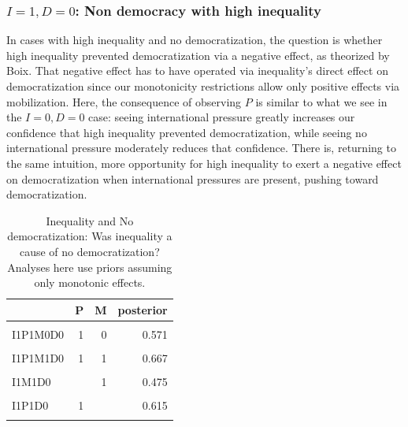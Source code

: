 \documentclass[
  12pt,
]{book}
\begin{document}
\hypertarget{i1-d0-non-democracy-with-high-inequality}{%
\subsubsection{\texorpdfstring{\(I=1, D=0\): Non democracy with high inequality}{I=1, D=0: Non democracy with high inequality}}\label{i1-d0-non-democracy-with-high-inequality}}

In cases with high inequality and no democratization, the question is whether high inequality prevented democratization via a negative effect, as theorized by Boix. That negative effect has to have operated via inequality's direct effect on democratization since our monotonicity restrictions allow only positive effects via mobilization. Here, the consequence of observing \(P\) is similar to what we see in the \(I=0, D=0\) case: seeing international pressure greatly increases our confidence that high inequality prevented democratization, while seeing no international pressure moderately reduces that confidence. There is, returning to the same intuition, more opportunity for high inequality to exert a negative effect on democratization when international pressures are present, pushing toward democratization.

\begin{table}

\caption{\label{tab:Tapp2}Inequality and No democratization: Was inequality a cause of no democratization? Analyses here use priors assuming only monotonic effects.}
\centering
\begin{tabular}[t]{lrrr}
\toprule
  & P & M & posterior\\
\midrule
\cellcolor{gray!6}{I1P0M0D0} & \cellcolor{gray!6}{0} & \cellcolor{gray!6}{0} & \cellcolor{gray!6}{0.263}\\
I1P1M0D0 & 1 & 0 & 0.571\\
\cellcolor{gray!6}{I1P0M1D0} & \cellcolor{gray!6}{0} & \cellcolor{gray!6}{1} & \cellcolor{gray!6}{0.393}\\
I1P1M1D0 & 1 & 1 & 0.667\\
\cellcolor{gray!6}{I1M0D0} & \cellcolor{gray!6}{} & \cellcolor{gray!6}{0} & \cellcolor{gray!6}{0.394}\\
\addlinespace
I1M1D0 &  & 1 & 0.475\\
\cellcolor{gray!6}{I1P0D0} & \cellcolor{gray!6}{0} & \cellcolor{gray!6}{} & \cellcolor{gray!6}{0.340}\\
I1P1D0 & 1 &  & 0.615\\
\cellcolor{gray!6}{I1D0} & \cellcolor{gray!6}{} & \cellcolor{gray!6}{} & \cellcolor{gray!6}{0.438}\\
\bottomrule
\end{tabular}
\end{table}
\end{document}
